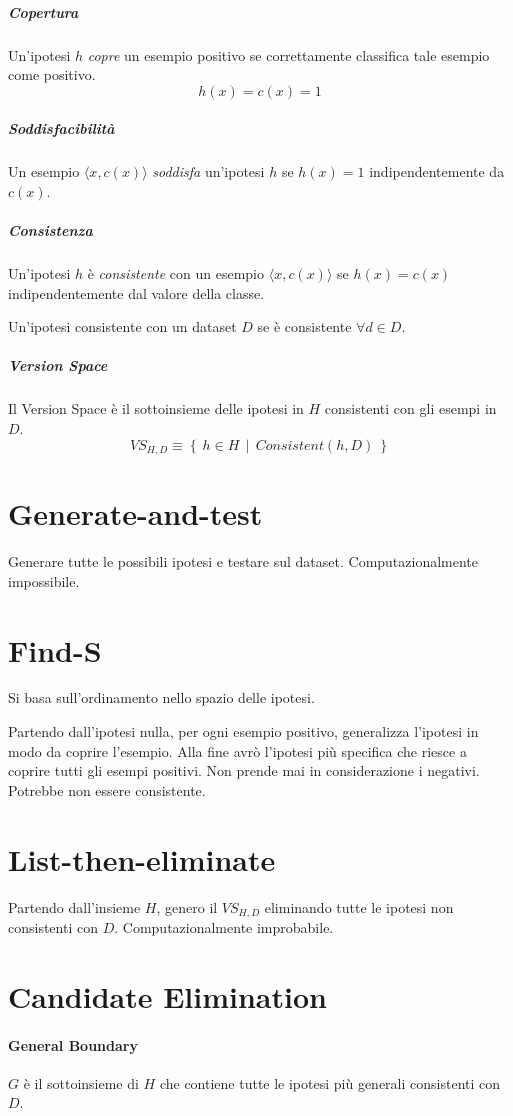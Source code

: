 \documentclass[11pt,onecolumn,a4paper,oneside]{book}
\begin{document}
		\subparagraph{Copertura} Un'ipotesi $h$ \emph{copre} un esempio positivo se correttamente classifica tale esempio come positivo.
	$$ h(x) = c(x) = 1 $$
		\subparagraph{Soddisfacibilità} Un esempio $\langle x, c(x)\rangle$ \emph{soddisfa} un'ipotesi $h$ se $h(x) = 1$ indipendentemente da $c(x)$.
	
		\subparagraph{Consistenza} Un'ipotesi $h$ è \emph{consistente} con un esempio $\langle x, c(x) \rangle$ se $h(x) = c(x)$ indipendentemente dal valore della classe.
		
		Un'ipotesi consistente con un dataset $D$ se è consistente $\forall d \in D$.
		
		\subparagraph{Version Space} Il Version Space è il sottoinsieme delle ipotesi in $H$ consistenti con gli esempi in $D$.
		$$VS_{H,D} \equiv \left\{ ~ h \in H~~|~~ Consistent(h,D) ~ \right\}$$
	
	\section{Generate-and-test}
		Generare tutte le possibili ipotesi e testare sul dataset.
		Computazionalmente impossibile.
	
	\section{Find-S}
	Si basa sull'ordinamento nello spazio delle ipotesi.
	
	Partendo dall'ipotesi nulla, per ogni esempio positivo, generalizza l'ipotesi in modo da coprire l'esempio.
	Alla fine avrò l'ipotesi più specifica che riesce a coprire tutti gli esempi positivi. Non prende mai in considerazione i negativi. Potrebbe non essere consistente.
	
	\section{List-then-eliminate}
	Partendo dall'insieme $H$, genero il $VS_{H,D}$ eliminando tutte le ipotesi non consistenti con $D$. Computazionalmente improbabile.

	\section{Candidate Elimination}
		\paragraph{General Boundary} $G$ è il sottoinsieme di $H$ che contiene tutte le ipotesi	 più generali consistenti con $D$.
		
\end{document}
